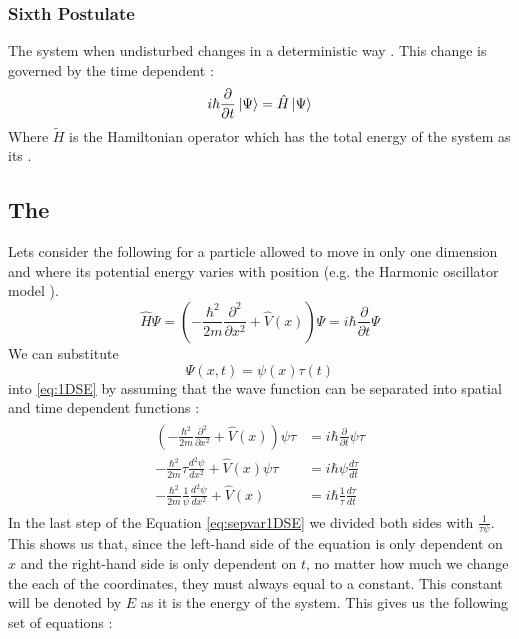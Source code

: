 \documentclass[../master_thesis.tex]{subfiles}
\begin{document}
\subsubsection{Sixth Postulate}
The system when undisturbed changes in a deterministic way \cite{Cohen:1973}.
This change is governed by the time dependent \SE \cite{Cohen:1973, Atkins:2011}:
\begin{equation}\label{eq:tdepSE}
  i\hbar\frac{\partial}{\partial t} \ket{\Psi} = \hat{H}\ket{\Psi}
\end{equation}
Where $\tilde{H}$ is the Hamiltonian operator which has the total energy of the
system as its \eivals.

\subsection{The \SE}
Lets consider the following \SE for a particle allowed to move in only one dimension
and where its potential energy varies with position (e.g. the Harmonic oscillator
model \cite{Cohen:1973, Atkins:2014}).
\begin{equation}
  \hat{H}\Psi = \left(-\frac{\hbar^2}{2m}\frac{\partial^2 }{\partial x^2} + \hat{V}(x)\right)\Psi = i\hbar\frac{\partial}{\partial t} \Psi\label{eq:1DSE}
\end{equation}
We can substitute $$\Psi(x, t)=\psi(x)\tau(t)$$ into \ref{eq:1DSE}
by assuming that the wave function can be separated into spatial and time dependent
functions \cite{Atkins:2011}:
\begin{align}
  \begin{split}\label{eq:sepvar1DSE}
    \left(-\frac{\hbar^2}{2m}\frac{\partial^2 }{\partial x^2} + \hat{V}(x)\right)\psi\tau &= i\hbar\frac{\partial}{\partial t} \psi\tau \\
    -\frac{\hbar^2}{2m}\tau\frac{d^2 \psi}{d x^2} + \hat{V}(x)\psi\tau &= i\hbar\psi\frac{d\tau}{d t}\\
    -\frac{\hbar^2}{2m}\frac{1}{\psi}\frac{d^2\psi }{d x^2} + \hat{V}(x) &= i\hbar\frac{1}{\tau}\frac{d\tau}{d t}
  \end{split}
\end{align}
In the last step of the Equation \ref{eq:sepvar1DSE} we divided both sides with $\frac{1}{\tau\psi}$.
This shows us that, since the left-hand side of the equation is only dependent on $x$ and the right-hand
side is only dependent on $t$, no matter how much we change the each of the coordinates, they must always equal to
a constant. This constant will be denoted by $E$ as it is the energy of the system. This gives us the following set of equations \cite{Atkins:2011}:
\end{document}
